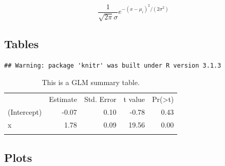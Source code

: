 \documentclass[]{article}
\begin{document}
\[ \frac{1}{\sqrt{2\pi}\sigma}e^{-(x-\mu_i)^2/(2\sigma^2)} \]

\subsection{Tables}\label{tables}

\begin{verbatim}
## Warning: package 'knitr' was built under R version 3.1.3
\end{verbatim}

\begin{longtable}[c]{@{}lrrrr@{}}
\toprule\addlinespace
& Estimate & Std. Error & t value &
Pr(\textgreater{}\textbar{}t\textbar{})
\\\addlinespace
\midrule\endhead
(Intercept) & -0.07 & 0.10 & -0.78 & 0.43
\\\addlinespace
x & 1.78 & 0.09 & 19.56 & 0.00
\\\addlinespace
\bottomrule
\addlinespace
\caption{This is a GLM summary table.}
\end{longtable}

\subsection{Plots}\label{plots}
\end{document}
